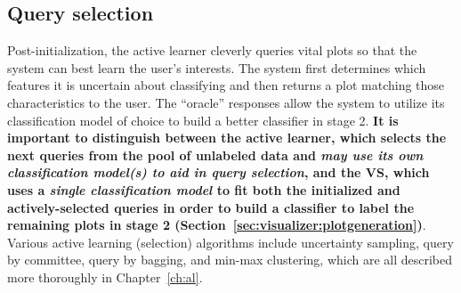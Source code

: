 \subsection{Query selection}
\label{sec:visualizer:al:tree}

Post-initialization, the active learner cleverly queries vital plots so that 
the system can best learn the user's interests. The system first determines 
which features it is uncertain about classifying and then returns a plot 
matching those characteristics to the user. The ``oracle'' responses allow the 
system to utilize its classification model of choice to build a better 
classifier in stage 2. \textbf{
	It is important to distinguish between the active learner, which 
	selects the next queries from the pool of unlabeled data and \textit{may 
	use its own classification model(s) to aid in query selection}, and the VS, 
	which uses a \textit{single classification model} to fit both the 
	initialized and actively-selected queries in order to build a classifier to 
	label the remaining plots in stage 2 
	(Section~\ref{sec:visualizer:plotgeneration})}. 
Various active learning (selection) algorithms include uncertainty sampling, 
query by committee, query by bagging, and min-max clustering, which are all
described more thoroughly in Chapter~\ref{ch:al}.